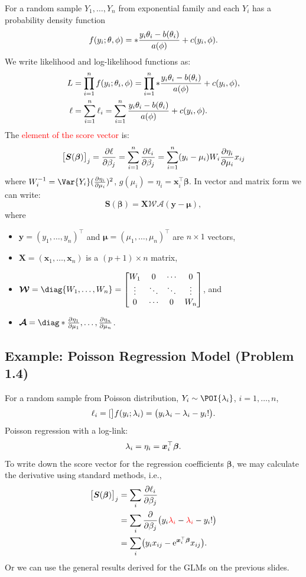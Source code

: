 \documentclass{article}\usepackage[]{graphicx}\usepackage[svgnames]{xcolor}
\let\exp\relax%
\let\log\relax%
\providecommand{\Vector}[1]{\bm{#1}}%
\providecommand{\Matrix}[1]{\bm{#1}}
\providecommand{\MatrixCal}[1]{\bm{\mathcal{#1}}}
\begin{document}
For a random sample $ Y_1,\ldots,Y_n $ from exponential family and each $ Y_i $ has a probability density function
\[ f(y_i;\theta,\phi)=\exp*{\frac{y_i\theta_i-b(\theta_i)}{a(\phi)}+c(y_i,\phi)}. \]
We write likelihood and log-likelihood functions as:
\begin{align*}
    L    & =\prod_{i=1}^n f(y_i;\theta_i,\phi)=\prod_{i=1}^n\exp*{\frac{y_i\theta_i-b(\theta_i)}{a(\phi)}+c(y_i,\phi)}, \\
    \ell & =\sum_{i=1}^{n} \ell_i=\sum_{i=1}^{n}\frac{y_i\theta_i-b(\theta_i)}{a(\phi)}+c(y_i,\phi).
\end{align*}
The \textcolor{Red}{element of the score vector} is:
\[ \bigl[\Vector{S}(\Vector{\beta})\bigr]_j=\pdv{\ell}{\beta_j}=\sum_{i=1}^{n} \pdv{\ell_i}{\beta_j}=\sum_{i=1}^{n} (y_i-\mu_i)W_i\pdv{\eta_i}{\mu_i}x_{ij} \]
where $  W_i^{-1}=\Var{Y_i}(\pdv{\eta_i}{\mu_i})^2 $, $ g(\mu_i)=\eta_i=\Vector{x}_i^\top \Vector{\beta} $. In vector and matrix form we can write:
\[ \Vector{S}(\Vector{\beta})=\Matrix{X}\MatrixCal{W}\MatrixCal{A}(\Vector{y}-\Vector{\mu}), \]
where
\begin{itemize}
    \item $ \Vector{y}=(y_1,\ldots,y_n)^\top $ and $ \Vector{\mu}=(\mu_1,\ldots,\mu_n)^\top $ are $ n\times 1 $ vectors,
    \item $ \Matrix{X}=(\Vector{x}_1,\ldots,\Vector{x}_n) $ is a $ (p+1)\times n $ matrix,
    \item $ \MatrixCal{W}=\diag{W_1,\ldots,W_n}=\begin{bmatrix}
                  W_1    & 0      & \cdots & 0      \\
                  \vdots & \ddots & \ddots & \vdots \\
                  0      & \cdots & 0      & W_n
              \end{bmatrix} $, and
    \item $ \MatrixCal{A}=\diag*{\pdv{\eta_1}{\mu_1},\ldots,\pdv{\eta_n}{\mu_n}} $.
\end{itemize}
\subsection*{Example: Poisson Regression Model (Problem 1.4)}
For a random sample from Poisson distribution, $ Y_i \sim \POI{\lambda_i} $, $ i=1,\ldots,n $,
\[ \ell_i=\log[\big]{f(y_i;\lambda_i)}=\bigl(y_i\log{\lambda_i}-\lambda_i-\log{y_i!}\bigr). \]
Poisson regression with a log-link:
\[ \log{\lambda_i}=\eta_i=\Vector{x}_i^\top \Vector{\beta}. \]
To write down the score vector for the regression coefficients $ \Vector{\beta} $, we may
calculate the derivative using standard methods, i.e.,
\begin{align*}
    \bigl[\Vector{S}(\Vector{\beta})\bigr]_j
     & =\sum_i \pdv{\ell_i}{\beta_j}                                                                                  \\
     & =\sum_i \pdv*{\bigl(y_i \textcolor{Red}{\log{\lambda_i}}-\textcolor{Red}{\lambda_i}-\log{y_i!}\bigr)}{\beta_j} \\
     & =\sum_i\bigl(y_i x_{ij}-\mathrm{e}^{\Vector{x}_i^\top \Vector{\beta}}x_{ij}\bigr).
\end{align*}
Or we can use the general results derived for the GLMs on the previous slides.
\end{document}
